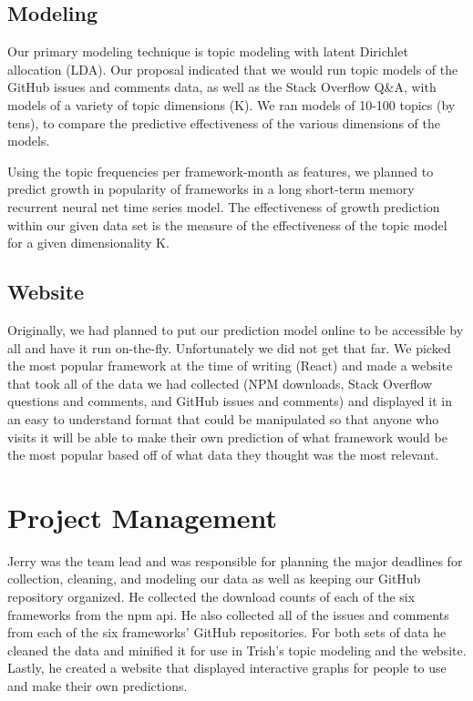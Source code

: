 \documentclass[conference]{IEEEtran}
\begin{document}
\subsection{Modeling}
Our primary modeling technique is topic modeling with latent Dirichlet allocation (LDA). Our proposal indicated that we would run topic models of the GitHub issues and comments data, as well as the Stack Overflow Q\&A, with models of a variety of topic dimensions (K). We ran models of 10-100 topics (by tens), to compare the predictive effectiveness of the various dimensions of the models.
 
Using the topic frequencies per framework-month as features, we planned to predict growth in popularity of frameworks in a long short-term memory recurrent neural net time series model. The effectiveness of growth prediction within our given data set is the measure of the effectiveness of the topic model for a given dimensionality K.

\subsection{Website}
Originally, we had planned to put our prediction model online to be accessible by all and have it run on-the-fly. Unfortunately we did not get that far. We picked the most popular framework at the time of writing (React) and made a website that took all of the data we had collected (NPM downloads, Stack Overflow questions and comments, and GitHub issues and comments) and displayed it in an easy to understand format that could be manipulated so that anyone who visits it will be able to make their own prediction of what framework would be the most popular based off of what data they thought was the most relevant.



\section{Project Management}
Jerry was the team lead and was responsible for planning the major deadlines for collection, cleaning, and modeling our data as well as keeping our GitHub repository organized. He collected the download counts of each of the six frameworks from the npm api. He also collected all of the issues and comments from each of the six frameworks' GitHub repositories. For both sets of data he cleaned the data and minified it for use in Trish's topic modeling and the website. Lastly, he created a website that displayed interactive graphs for people to use and make their own predictions.
\end{document}
